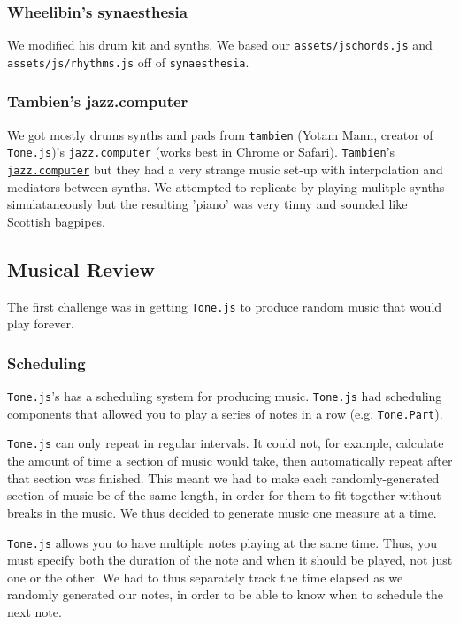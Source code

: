 \documentclass[12pt,a4paper]{article}
\newcommand{\code}{\texttt}
\newcommand{\lightcode}[1]{\colorbox{light-gray}{\texttt{#1}}}
\begin{document}
\subsubsection{Wheelibin's synaesthesia}
We modified his drum kit and synths. We based our \code{assets/jschords.js} and \code{assets/js/rhythms.js} off of \lightcode{synaesthesia}.

\subsubsection{Tambien's jazz.computer}
We got mostly drums synths and pads from \code{tambien} (Yotam Mann, creator of \lightcode{Tone.js})'s \href{http://jazz.computer/}{\lightcode{jazz.computer}} (works best in Chrome or Safari). \code{Tambien}'s \href{http://jazz.computer/}{\lightcode{jazz.computer}} but they had a very strange music set-up with interpolation and mediators between synths. We attempted to replicate by playing mulitple synths simulataneously but the resulting 'piano' was very tinny and sounded like Scottish bagpipes.


\subsection{Musical Review}

The first challenge was in getting \lightcode{Tone.js} to produce random music that would play forever.

\subsubsection{Scheduling}
\lightcode{Tone.js}'s has a scheduling system for producing music. \lightcode{Tone.js} had scheduling components that allowed you to play a series of notes in a row (e.g. \lightcode{Tone.Part}).

\lightcode{Tone.js} can only repeat in regular intervals. It could not, for example, calculate the amount of time a section of music would take, then automatically repeat after that section was finished. This meant we had to make each randomly-generated section of music be of the same length, in order for them to fit together without breaks in the music. We thus decided to generate music one measure at a time.

\lightcode{Tone.js} allows you to have multiple notes playing at the same time. Thus, you must specify both the duration of the note and when it should be played, not just one or the other. We had to thus separately track the time elapsed as we randomly generated our notes, in order to be able to know when to schedule the next note.
\end{document}
